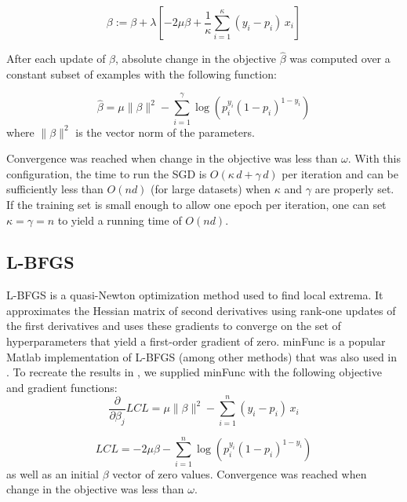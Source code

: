 \documentclass[10pt]{article}
\begin{document}
\begin{equation}\label{SGD_grad}
    \beta := \beta + \lambda [-2 \mu \beta + \frac{1}{\kappa}\sum_{i=1}^{\kappa}{(y_i - p_i)\,x_i}]
\end{equation}

After each update of $\beta$, absolute change in the objective $\widehat{\beta}$ was computed over a constant subset of examples with the following function:

\begin{equation}\label{SGD_obj}
    \widehat{\beta} = \mu \|\beta\|^2 - \sum_{i=1}^{\gamma}{\log(p_i^{y_i}(1 - p_i)^{1-y_i})}
\end{equation}
where $\|\beta\|^2$ is the vector norm of the parameters.


Convergence was reached when change in the objective was less than $\omega$. With this configuration, the time to run the SGD is $O(\kappa\,d + \gamma\,d)$ per iteration and can be sufficiently less than $O(nd)$ (for large datasets) when $\kappa$ and $\gamma$ are properly set. If the training set is small enough to allow one epoch per iteration, one can set $\kappa = \gamma = n$ to yield a running time  of $O(nd)$.


\subsection{L-BFGS}
L-BFGS is a quasi-Newton optimization method used to find local extrema. It approximates the Hessian matrix of second derivatives using rank-one updates of the first derivatives and uses these gradients to converge on the set of hyperparameters that yield a first-order gradient of zero. minFunc is a popular Matlab implementation of L-BFGS (among other methods) that was also used in \cite{t-logistic}. To recreate the results in \cite{t-logistic}, we supplied minFunc with the following objective and gradient functions:
\begin{equation}\label{LBFGS_grad}
    \frac{\partial}{\partial \beta_j}LCL = \mu \|\beta\|^2 - \sum_{i=1}^{n}{(y_i - p_i)\,x_i}
\end{equation}

\begin{equation}\label{LBFGS_obj}
    LCL = -2 \mu \beta - \sum_{i=1}^{n}{\log(p_i^{y_i}(1 - p_i)^{1-y_i})}
\end{equation}
as well as an initial $\beta$ vector of zero values. Convergence was reached when change in the objective was less than $\omega$.
\end{document}
